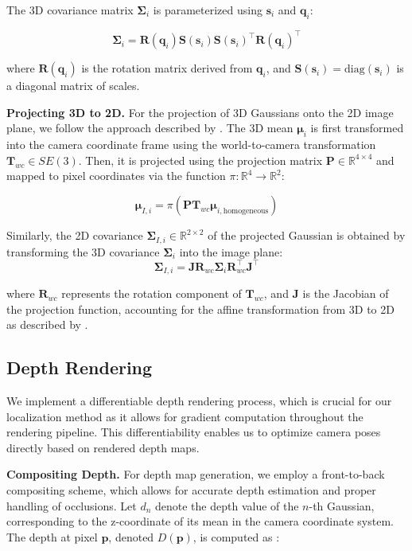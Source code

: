 \documentclass[twocolumn]{article}
\begin{document}
The 3D covariance matrix \(\boldsymbol{\Sigma}_i\) is parameterized
using \(\mathbf{s}_i\) and \(\mathbf{q}_i\):

\[
\boldsymbol{\Sigma}_i = \mathbf{R}(\mathbf{q}_i) \mathbf{S}(\mathbf{s}_i) \mathbf{S}(\mathbf{s}_i)^\top \mathbf{R}(\mathbf{q}_i)^\top
\]

where \(\mathbf{R}(\mathbf{q}_i)\) is the rotation matrix derived from
\(\mathbf{q}_i\), and
\(\mathbf{S}(\mathbf{s}_i) = \text{diag}(\mathbf{s}_i)\) is a diagonal
matrix of scales.

\textbf{Projecting 3D to 2D.} For the projection of 3D Gaussians onto
the 2D image plane, we follow the approach described by
\autocite{kerbl3DGaussianSplatting2023}. The 3D mean
\(\boldsymbol{\mu}_i\) is first transformed into the camera coordinate
frame using the world-to-camera transformation
\(\mathbf{T}_{wc} \in SE(3)\). Then, it is projected using the
projection matrix \(\mathbf{P} \in \mathbb{R}^{4 \times 4}\) and mapped
to pixel coordinates via the function
\(\pi: \mathbb{R}^4 \rightarrow \mathbb{R}^2\):

\[
\boldsymbol{\mu}_{I,i} = \pi\left( \mathbf{P} \mathbf{T}_{wc} \boldsymbol{\mu}_{i,\text{homogeneous}} \right)
\]

Similarly, the 2D covariance
\(\boldsymbol{\Sigma}_{I,i} \in \mathbb{R}^{2\times2}\) of the projected
Gaussian is obtained by transforming the 3D covariance
\(\boldsymbol{\Sigma}_i\) into the image plane: \[
\boldsymbol{\Sigma}_{I,i} = \mathbf{J} \mathbf{R}_{wc} \boldsymbol{\Sigma}_i \mathbf{R}_{wc}^\top \mathbf{J}^\top
\]

where \(\mathbf{R}_{wc}\) represents the rotation component of
\(\mathbf{T}_{wc}\), and \(\mathbf{J}\) is the Jacobian of the
projection function, accounting for the affine transformation from 3D to
2D as described by \autocite{zwickerEWASplatting2002}.

\subsection{Depth Rendering}\label{depth-rendering}

We implement a differentiable depth rendering process, which is crucial
for our localization method as it allows for gradient computation
throughout the rendering pipeline. This differentiability enables us to
optimize camera poses directly based on rendered depth maps.

\textbf{Compositing Depth.} For depth map generation, we employ a
front-to-back compositing scheme, which allows for accurate depth
estimation and proper handling of occlusions. Let \(d_n\) denote the
depth value of the \(n\)-th Gaussian, corresponding to the z-coordinate
of its mean in the camera coordinate system. The depth at pixel
\(\mathbf{p}\), denoted \(D(\mathbf{p})\), is computed as
\autocite{kerbl3DGaussianSplatting2023}:
\end{document}
